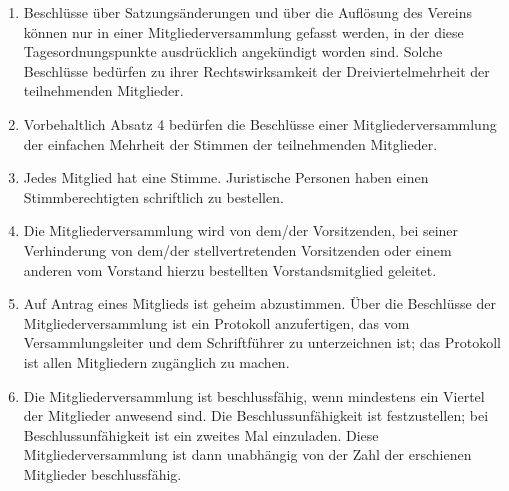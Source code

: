 \documentclass[a4paper]{article}
\begin{document}
\begin{enumerate}
    \item Beschlüsse über Satzungsänderungen und über die Auflösung des Vereins können nur in einer Mitgliederversammlung gefasst werden, in der diese Tagesordnungspunkte ausdrücklich angekündigt worden sind. Solche Beschlüsse bedürfen zu ihrer Rechtswirksamkeit der Dreiviertelmehrheit der teilnehmenden Mitglieder.

    \item Vorbehaltlich Absatz 4 bedürfen die Beschlüsse einer Mitgliederversammlung der einfachen Mehrheit der Stimmen der teilnehmenden Mitglieder.

    \item Jedes Mitglied hat eine Stimme. Juristische Personen haben einen Stimmberechtigten schriftlich zu bestellen.

    \item Die Mitgliederversammlung wird von dem/der Vorsitzenden, bei seiner Verhinderung von dem/der stellvertretenden Vorsitzenden oder einem anderen vom Vorstand hierzu bestellten Vorstandsmitglied geleitet.

    \item Auf Antrag eines Mitglieds ist geheim abzustimmen. Über die Beschlüsse der Mitgliederversammlung ist ein Protokoll anzufertigen, das vom Versammlungsleiter und dem Schriftführer zu unterzeichnen ist; das Protokoll ist allen Mitgliedern zugänglich zu machen.

    \item Die Mitgliederversammlung ist beschlussfähig, wenn mindestens ein Viertel der Mitglieder anwesend sind. Die Beschlussunfähigkeit ist festzustellen; bei Beschlussunfähigkeit ist ein zweites Mal einzuladen. Diese Mitgliederversammlung ist dann unabhängig von der Zahl der erschienen Mitglieder beschlussfähig.
\end{enumerate}
\end{document}
